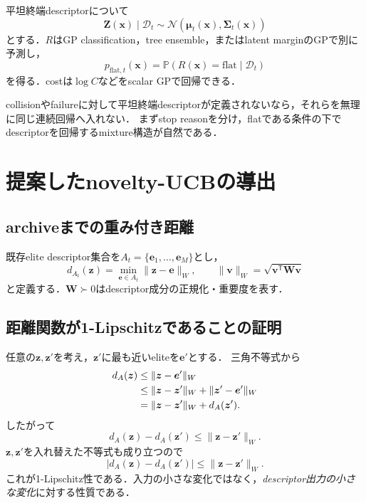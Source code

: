 \documentclass[a4paper,11pt]{ltjsarticle}
\newcommand{\Pp}{\mathbb P}
\newcommand{\N}{\mathcal N}
\newcommand{\D}{\mathcal D}
\newcommand{\T}{\mathsf T}
\begin{document}
平坦終端descriptorについて
\begin{equation}
  \bm Z(\bm x)\mid\D_t
  \sim\N(\bm\mu_t(\bm x),\bm\Sigma_t(\bm x))
  \label{eq:terminal-vector-gp}
\end{equation}
とする．\(R\)はGP classification，tree ensemble，またはlatent marginのGPで別に予測し，
\begin{equation}
  p_{\mathrm{flat},t}(\bm x)
  =\Pp(R(\bm x)=\mathrm{flat}\mid\D_t)
\end{equation}
を得る．costは\(\log C\)などをscalar GPで回帰できる．

collisionやfailureに対して平坦終端descriptorが定義されないなら，それらを無理に同じ連続回帰へ入れない．
まずstop reasonを分け，flatである条件の下でdescriptorを回帰するmixture構造が自然である．

\section{提案したnovelty-UCBの導出}
\label{sec:novelty-ucb}

\subsection{archiveまでの重み付き距離}

既存elite descriptor集合を\(A_t=\{\bm e_1,\ldots,\bm e_M\}\)とし，
\begin{equation}
  d_{A_t}(\bm z)
  =\min_{\bm e\in A_t}\|\bm z-\bm e\|_W,
  \qquad
  \|\bm v\|_W=\sqrt{\bm v^\T\bm W\bm v}
  \label{eq:archive-distance}
\end{equation}
と定義する．\(\bm W\succ0\)はdescriptor成分の正規化・重要度を表す．

\subsection{距離関数が1-Lipschitzであることの証明}

任意の\(\bm z,\bm z'\)を考え，\(\bm z'\)に最も近いeliteを\(\bm e'\)とする．
三角不等式から
\begin{align}
  d_A(\bm z)
  &\leq\|\bm z-\bm e'\|_W\notag\\
  &\leq\|\bm z-\bm z'\|_W+\|\bm z'-\bm e'\|_W\notag\\
  &=\|\bm z-\bm z'\|_W+d_A(\bm z').
\end{align}
したがって
\begin{equation}
  d_A(\bm z)-d_A(\bm z')\leq\|\bm z-\bm z'\|_W.
\end{equation}
\(\bm z,\bm z'\)を入れ替えた不等式も成り立つので
\begin{equation}
  \boxed{
  |d_A(\bm z)-d_A(\bm z')|
  \leq\|\bm z-\bm z'\|_W.}
  \label{eq:archive-distance-lipschitz}
\end{equation}
これが1-Lipschitz性である．入力の小さな変化ではなく，\emph{descriptor出力の小さな変化}に対する性質である．
\end{document}
